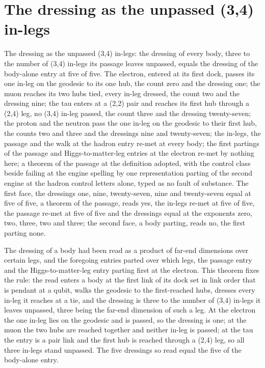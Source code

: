 \section{The dressing as the unpassed (3,4) in-legs}\label{mod:VIII-1-D540455-upil-t1}
\begin{chtheorem}\label{box:VIII-1-D540455-upil-t1:1}
The dressing as the unpassed (3,4) in-legs: the dressing of every body, three to the number of (3,4) in-legs its passage leaves unpassed, equals the dressing of the body-alone entry at five of five. The electron, entered at its first dock, passes its one in-leg on the geodesic to its one hub, the count zero and the dressing one; the muon reaches its two hubs tied, every in-leg dressed, the count two and the dressing nine; the tau enters at a (2,2) pair and reaches its first hub through a (2,4) leg, no (3,4) in-leg passed, the count three and the dressing twenty-seven; the proton and the neutron pass the one in-leg on the geodesic to their first hub, the counts two and three and the dressings nine and twenty-seven; the in-legs, the passage and the walk at the hadron entry re-met at every body; the first partings of the passage and Higgs-to-matter-leg entries at the electron re-met by nothing here; a theorem of the passage at the definition adopted, with the control class beside failing at the engine spelling by one representation parting of the second engine at the hadron control letters alone, typed as no fault of substance.
The first face, the dressings one, nine, twenty-seven, nine and twenty-seven equal at five of five, a theorem of the passage, reads yes, the in-legs re-met at five of five, the passage re-met at five of five and the dressings equal at the exponents zero, two, three, two and three; the second face, a body parting, reads no, the first parting none.
\end{chtheorem}
The dressing of a body had been read as a product of far-end dimensions over certain legs, and the foregoing entries parted over which legs, the passage entry and the Higgs-to-matter-leg entry parting first at the electron. This theorem fixes the rule: the read enters a body at the first link of its dock set in link order that is pendant at a qubit, walks the geodesic to the first-reached hubs, dresses every in-leg it reaches at a tie, and the dressing is three to the number of (3,4) in-legs it leaves unpassed, three being the far-end dimension of such a leg. At the electron the one in-leg lies on the geodesic and is passed, so the dressing is one; at the muon the two hubs are reached together and neither in-leg is passed; at the tau the entry is a pair link and the first hub is reached through a (2,4) leg, so all three in-legs stand unpassed. The five dressings so read equal the five of the body-alone entry.
